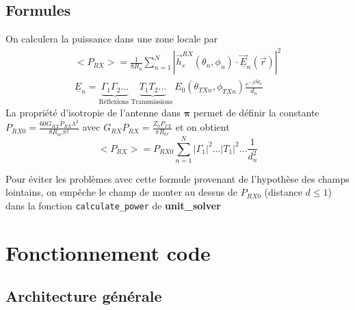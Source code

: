 \documentclass[sn-mathphys-num]{sn-jnl}%
\theoremstyle{thmstyleone}%
\theoremstyle{thmstyletwo}%
\theoremstyle{thmstylethree}%
\begin{document}
    \subsection{Formules}

    On calculera la puissance dans une zone locale par
    \begin{align}
        <P_{R X}>=\frac{1}{8 R_a} \sum_{n=1}^N\left|\vec{h}_e^{R X}\left(\theta_n, \phi_n\right) \cdot \underline{\vec{E}}_n(\vec{r})\right|^2\\
        \underline{E}_n=\underbrace{\Gamma_1 \Gamma_2 \ldots}_{\text {Réflexions }} \underbrace{T_1 T_2 \ldots}_{\text {Transmissions }} E_0\left(\theta_{T X n}, \phi_{T X n}\right) \frac{e^{-j \beta d_n}}{d_n}
    \end{align}
    La propriété d'isotropie de l'antenne dans $\mathbf{\pi}$ permet de définir la constante $P_{RX0} = \frac{60 G_{RX}P_{RX} \lambda^2}{8 R_{ar} \pi^2}$ avec
    $G_{RX}P_{RX} = \frac{Z_0 P_{TX}}{\pi R_{ar}}$ et on obtient
    \begin{equation}
    \label{f:p_moy}
        <P_{RX}> = P_{RX0} \sum_{n=1}^N |\Gamma_1|^2 \dots |T_1|^2 \dots \frac{1}{d_n^2}
    \end{equation}

    Pour éviter les problèmes avec cette formule provenant de l'hypothèse des champs lointains,
    on empêche le champ de monter au dessus de $P_{RX0}$ (distance $d \le 1$)
    dans la fonction \texttt{calculate\_power} de \textbf{unit\_solver}


 
\section{Fonctionnement code}
\subsection{Architecture générale}
\end{document}
